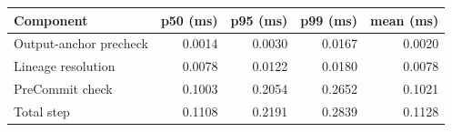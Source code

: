 \begin{tabular}{@{}lrrrr@{}}
\toprule
Component & p50 (ms) & p95 (ms) & p99 (ms) & mean (ms) \\
\midrule
Output-anchor precheck & 0.0014 & 0.0030 & 0.0167 & 0.0020 \\
Lineage resolution & 0.0078 & 0.0122 & 0.0180 & 0.0078 \\
PreCommit check & 0.1003 & 0.2054 & 0.2652 & 0.1021 \\
Total step & 0.1108 & 0.2191 & 0.2839 & 0.1128 \\
\bottomrule
\end{tabular}

